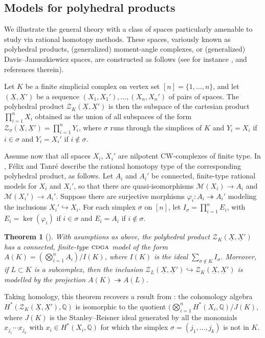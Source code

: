 \documentclass{article}
\numberwithin{equation}{section}
\newtheorem{theorem}{Theorem}[section]
\theoremstyle{definition}
\newcommand{\Q}{\mathbb{Q}}
\newcommand{\M}{\mathcal{M}}
\newcommand{\ZZ}{{\mathcal{Z}}}
\newcommand{\cdga}{\ensuremath{\textsc{cdga}}}
\newcommand{\surj}{\twoheadrightarrow}
\newcommand{\inj}{\hookrightarrow}
\newcommand{\uX}{\underline{X}}
\begin{document}
\subsection{Models for polyhedral products}
\label{subsec:pp}

We illustrate the general theory with a class of spaces particularly amenable 
to study via rational homotopy methods. These spaces, variously known as 
polyhedral products, (generalized) moment-angle complexes, or (generalized) 
Davis--Januszkiewicz spaces, are constructed as follows (see for instance 
\cite{DeS07}, \cite{BBCG} and references therein). 

Let $K$ be a finite simplicial complex on vertex set $[n]=\{1,\dots,n\}$, 
and let $(\uX,\uX')$ be a sequence $(X_1,X_1'), 
\dots , (X_n,X_n')$ of pairs of spaces. The polyhedral product 
$\ZZ_K(\uX,\uX')$ is then 
the subspace of the cartesian product $\prod_{i=1}^n X_i$ 
obtained as the union of all subspaces of the form 
$\ZZ_{\sigma}(\uX,\uX')=\prod_{i=1}^n Y_i$, 
where $\sigma$ runs through the simplices of $K$ and 
$Y_i=X_i$ if $i\in \sigma$ and $Y_i=X_i'$ if $i\notin \sigma$.

Assume now that all spaces $X_i$, $X_i'$ are nilpotent 
CW-complexes of finite type. In \cite{FT09}, F\'elix and Tanr\'e describe 
the rational homotopy type of the corresponding polyhedral product, as follows. 
Let $A_i$ and $A_i'$ be connected, finite-type rational models for 
$X_i$ and $X_i'$, so that there are quasi-isomorphisms 
$\M(X_i)\to A_i$ and  $\M(X_i')\to A_i'$. 
Suppose there are surjective morphisms 
$\varphi_i \colon A_i\surj A_i'$ modeling the inclusions $X_i' \inj X_i$. 
For each simplex $\sigma$ on $[n]$, let $I_{\sigma}=\prod_{i=1}^n E_i$, 
with $E_i=\ker(\varphi_i)$ if $i\in \sigma$ and 
$E_i=A_i$ if $i\notin \sigma$.

\begin{theorem}[\cite{FT09}]
\label{thm:ft-zk}
With asumptions as above, 
the polyhedral product $\ZZ_K(\uX,\uX')$ has a connected, 
finite-type $\cdga$ model of the form $A(K)=(\bigotimes_{i=1}^n A_i)/I(K)$, 
where $I(K)$ is the ideal $\sum_{\sigma\notin K} I_{\sigma}$. 
Moreover, if $L\subset K$ is a subcomplex, then the 
inclusion $\ZZ_L(\uX,\uX')\inj \ZZ_K(\uX,\uX')$
is modelled by the projection $A(K)\surj A(L)$.
\end{theorem}

Taking homology, this theorem recovers a result from \cite{BBCG}: 
the cohomology algebra $H^*(\ZZ_K(\uX,\uX'),\Q)$ is isomorphic 
to the quotient $(\bigotimes_{i=1}^n H^*(X_i,\Q)/J(K)$, where $J(K)$ 
is the Stanley--Reisner ideal generated by all the monomials 
$x_{j_1}\cdots x_{j_k}$ with $x_{i}\in  H^*(X_i,\Q)$ for which 
the simplex $\sigma=(j_1,\dots, j_k)$ is not in $K$.
\end{document}
